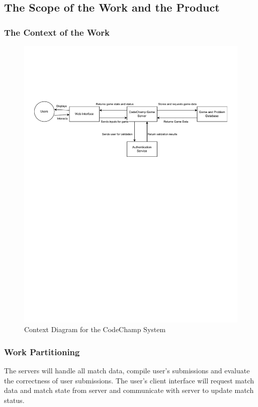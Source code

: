 \documentclass[12pt, titlepage]{article}
\begin{document}
\subsection{The Scope of the Work and the Product}

\subsubsection{The Context of the Work}
\begin{figure}[H]
    \hspace{-3cm}
    \includegraphics{context_diagram.pdf}
    \caption{Context Diagram for the CodeChamp System}
    \label{fig:context-diagram}
\end{figure}

\subsubsection{Work Partitioning}
The servers will handle all match data, compile user's submissions and evaluate the correctness of user submissions. The user's client interface will request match data and match state from server and communicate with server to update match status.
\end{document}
